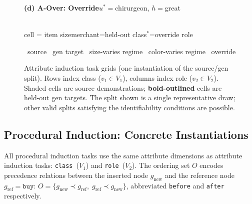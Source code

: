 \documentclass[11pt]{article}
\begin{document}
\begin{figure}[htb]
\begin{minipage}[t]{0.47\textwidth}
\centering
{\small\textbf{(d) A-Over: Override}\quad $u^*{=}$chirurgeon, $h{=}$great}\\[5pt]
\\[4pt]
{\scriptsize cell = item size\quad merchant=held-out class\quad $^*$=override role}
\end{minipage}

\vspace{6pt}
{\scriptsize
\colorbox{gray!22}{\phantom{i}}~source\quad
\fbox{\phantom{i}}~gen target\quad
\colorbox{green!20}{\phantom{i}}~size-varies regime\quad
\colorbox{blue!18}{\phantom{i}}~color-varies regime\quad
\colorbox{red!14}{\phantom{i}}~override
}

\caption{Attribute induction task grids (one instantiation of the source/gen split).
Rows index class ($v_1 \in V_1$), columns index role ($v_2 \in V_2$).
Shaded cells are source demonstrations; \textbf{bold-outlined} cells are held-out gen targets.
The split shown is a single representative draw; other valid splits satisfying the identifiability conditions are possible.}
\label{fig:prop_grids}
\end{figure}

\subsection{Procedural Induction: Concrete Instantiations}

All procedural induction tasks use the same attribute dimensions as attribute induction tasks: \texttt{class}~($V_1$) and \texttt{role}~($V_2$). The ordering set $O$ encodes precedence relations between the inserted node $g_\text{new}$ and the reference node $g_\text{ref}{=}\texttt{buy}$: $O{=}\{g_\text{new}\prec g_\text{ref},\;g_\text{ref}\prec g_\text{new}\}$, abbreviated \texttt{before} and \texttt{after} respectively.
\end{document}
